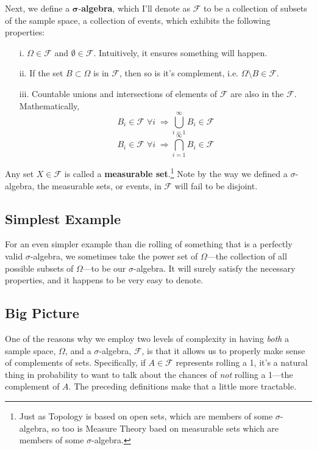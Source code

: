 \documentclass[12pt]{article}
\theoremstyle{plain}
\theoremstyle{definition}
\theoremstyle{remark}
\begin{document}
Next, we define a $\mathbf{\sigma}$-\textbf{algebra},
which I'll denote as
$\mathcal{F}$ to be a collection of subsets of the sample space, a
collection of events, which
exhibits the following properties:
\begin{itemize}
   \item[i.] $\Omega \in \mathcal{F}$ and $\emptyset \in \mathcal{F}$.
      Intuitively, it ensures something will happen.
   \item[ii.] If the set $B \subset \Omega$ is in $\mathcal{F}$,
      then so is it's complement, i.e. $\Omega \setminus B \in
      \mathcal{F}$.
   \item[iii.] Countable unions and intersections of elements of
      $\mathcal{F}$ are also in the $\mathcal{F}$.  Mathematically,
      \[ B_i \in \mathcal{F} \; \forall i \; \Rightarrow
	 \bigcup_{i=1}^{\infty} B_i \in \mathcal{F} \]
      \[ B_i \in \mathcal{F} \; \forall i \; \Rightarrow
	 \bigcap_{i=1}^{\infty} B_i \in \mathcal{F} \]
\end{itemize}
Any set $X \in \mathcal{F}$ is called a
\textbf{measurable set}.\footnote{Just as Topology is based on open
sets, which are members of some $\sigma$-algebra, so too is Measure
Theory baed on measurable sets which are members of some
$\sigma$-algebra.} Note by the way we defined a $\sigma$-algebra,
the measurable sets, or events, in $\mathcal{F}$ will fail to be
disjoint.



\subsection{Simplest Example}

For an even simpler example than die rolling of something that is
a perfectly valid $\sigma$-algebra, we
sometimes take the power set of $\Omega$---the collection of all
possible subsets of $\Omega$---to be our $\sigma$-algebra.  It will
surely satisfy the necessary properties, and it happens to be very easy
to denote.

\subsection{Big Picture}

One of the reasons why we employ two levels of complexity in having
\emph{both} a sample space, $\Omega$,
and a $\sigma$-algebra, $\mathcal{F}$, is that it allows us to
properly make sense of complements of sets.  Specifically, if $A \in
\mathcal{F}$ represents rolling a 1, it's a natural thing in
probability to want to talk about the chances of \emph{not} rolling
a 1---the complement of $A$. The preceding definitions make that a
little more tractable.
\end{document}
